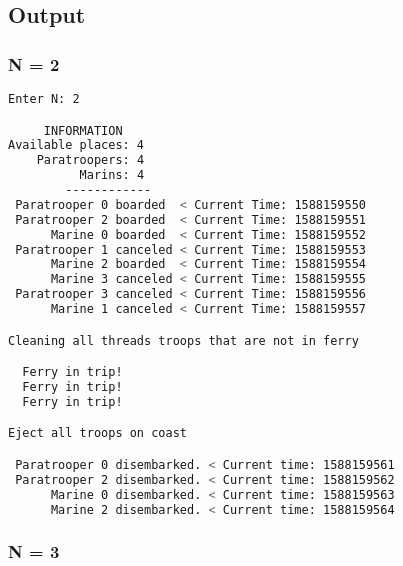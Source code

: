 \documentclass{article}
\begin{document}
\newpage
\subsection*{Output}
\subsubsection*{N = 2}
\begin{lstlisting}[language=BASH]
Enter N: 2

     INFORMATION
Available places: 4
    Paratroopers: 4
          Marins: 4
        ------------
 Paratrooper 0 boarded  < Current Time: 1588159550 
 Paratrooper 2 boarded  < Current Time: 1588159551 
      Marine 0 boarded  < Current Time: 1588159552 
 Paratrooper 1 canceled < Current Time: 1588159553 
      Marine 2 boarded  < Current Time: 1588159554 
      Marine 3 canceled < Current Time: 1588159555 
 Paratrooper 3 canceled < Current Time: 1588159556 
      Marine 1 canceled < Current Time: 1588159557 

Cleaning all threads troops that are not in ferry

  Ferry in trip!
  Ferry in trip!
  Ferry in trip!

Eject all troops on coast

 Paratrooper 0 disembarked. < Current time: 1588159561
 Paratrooper 2 disembarked. < Current time: 1588159562
      Marine 0 disembarked. < Current time: 1588159563
      Marine 2 disembarked. < Current time: 1588159564
\end{lstlisting}

\subsubsection*{N = 3}
\begin{lstlisting}[language=BASH]
\end{lstlisting}
\end{document}
